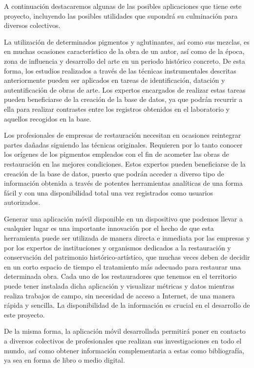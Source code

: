 A continuación destacaremos algunas de las posibles aplicaciones que tiene este proyecto, incluyendo las posibles utilidades que supondrá su culminación para diversos colectivos. 

La utilización de determinados pigmentos y aglutinantes, así como sus mezclas, es en muchas ocasiones característico de la obra de un autor, así como de la época, zona de influencia y desarrollo del arte en un periodo histórico concreto. De esta forma, los estudios realizados a través de las técnicas instrumentales descritas anteriormente pueden ser aplicados en tareas de identificación, datación y autentificación de obras de arte. Los expertos encargados de realizar estas tareas pueden beneficiarse de la creación de la base de datos, ya que podrán recurrir a ella para realizar contrastes entre los registros obtenidos en el laboratorio y aquellos recogidos en la base.

Los profesionales de empresas de restauración necesitan en ocasiones reintegrar partes dañadas siguiendo las técnicas originales. Requieren por lo tanto conocer los orígenes de los pigmentos empleados con el fin de acometer las obras de restauración en las mejores condiciones. Estos expertos pueden beneficiarse de la creación de la base de datos, puesto que podrán acceder a diverso tipo de información obtenida a través de potentes herramientas analíticas de una forma fácil y con una disponibilidad total una vez registrados como usuarios autorizados.

Generar una aplicación móvil disponible en un dispositivo que podemos llevar a cualquier lugar es una importante innovación por el hecho de que esta herramienta puede ser utilizada de manera directa e inmediata por las empresas y por los expertos de instituciones y organismos dedicados a la restauración y conservación del patrimonio histórico-artístico, que muchas veces deben de decidir en un corto espacio de tiempo el tratamiento más adecuado para restaurar una determinada obra. Cada uno de los restauradores que tenemos en el territorio puede tener instalada dicha aplicación y visualizar métricas y datos mientras realiza trabajos de campo, sin necesidad de acceso a Internet, de una manera rápida y sencilla. La disponibilidad de la información es crucial en el desarrollo de este proyecto. 

De la misma forma, la aplicación móvil desarrollada permitirá poner en contacto a diversos colectivos de profesionales que realizan sus investigaciones en todo el mundo, así como obtener información complementaria a estas como bibliografía, ya sea en forma de libro o medio digital.

